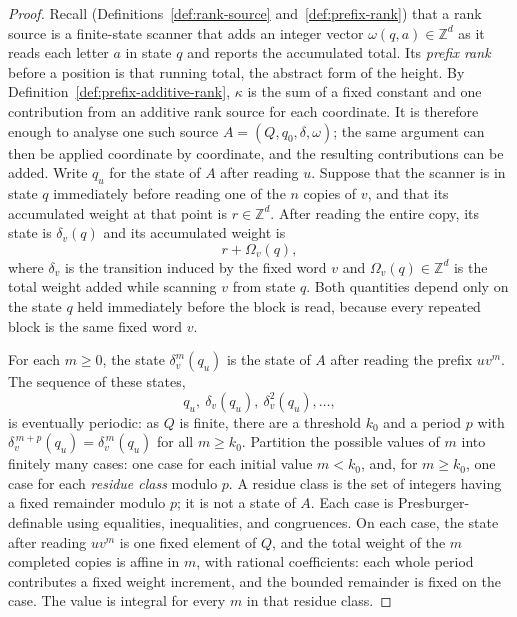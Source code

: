 \documentclass[11pt]{article}
\theoremstyle{definition}
\newcommand{\Z}{\mathbb Z}
\begin{document}
\begin{proof}
Recall (Definitions~\ref{def:rank-source} and~\ref{def:prefix-rank}) that a rank
source is a finite-state scanner that adds an integer vector
$\omega(q,a)\in\Z^d$ as it reads each letter $a$ in state $q$ and reports the
accumulated total.  Its \emph{prefix rank} before a position is that running
total, the abstract form of the height.  By
Definition~\ref{def:prefix-additive-rank}, $\kappa$ is the sum of a fixed
constant and one contribution from an additive rank source for each coordinate.
It is therefore enough to analyse one such source
$A=(Q,q_0,\delta,\omega)$; the same argument can then be applied coordinate by
coordinate, and the resulting contributions can be added.  Write
$q_u$ for the state of $A$ after reading $u$.  Suppose that the scanner is in
state $q$ immediately before reading one of the $n$ copies of $v$, and that its
accumulated weight at that point is $r\in\Z^d$.  After reading the entire copy,
its state is $\delta_v(q)$ and its accumulated weight is
\[
   r+\Omega_v(q),
\]
where $\delta_v$ is the transition induced by the fixed word $v$ and
$\Omega_v(q)\in\Z^d$ is the total weight added while scanning $v$ from state
$q$.  Both quantities depend only on the state $q$ held immediately before the
block is read, because every repeated block is the same fixed word $v$.

For each $m\ge 0$, the state $\delta_v^m(q_u)$ is the state of $A$ after reading
the prefix $uv^m$.  The sequence of these states,
\[
   q_u,\ \delta_v(q_u),\ \delta_v^2(q_u),\ldots,
\]
is eventually periodic: as $Q$ is finite, there are a threshold $k_0$ and a
period $p$ with
$\delta_v^{\,m+p}(q_u)=\delta_v^{\,m}(q_u)$ for all $m\ge k_0$.  Partition the
possible values of $m$ into finitely many cases: one case for each initial value
$m<k_0$, and, for $m\ge k_0$, one case for each \emph{residue class} modulo $p$.
A residue class is the set of integers having a fixed remainder modulo $p$;
it is not a state of $A$.  Each case is Presburger-definable using equalities,
inequalities, and congruences.  On each case, the state after reading $uv^m$ is
one fixed element of $Q$, and
the total weight of the $m$ completed copies is affine in $m$, with rational
coefficients: each whole period contributes a fixed weight increment, and the
bounded remainder is fixed on the case.  The value is integral for every $m$
in that residue class.


\end{proof}
\end{document}
